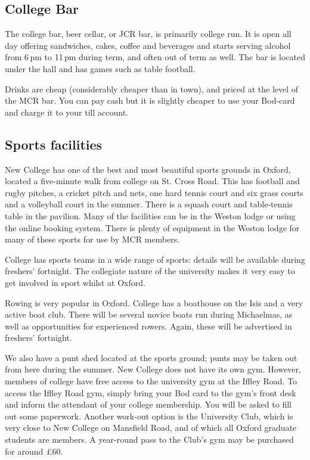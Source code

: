 \subsection{College Bar}
The college bar, beer cellar, or JCR bar, is primarily college run. It is open
all day offering sandwiches, cakes, coffee and beverages and starts serving
alcohol from 6\,pm to 11\,pm during term, and often out of term as well. The bar
is located under the hall and has games such as table football.

Drinks are cheap (considerably cheaper than in town), and priced at the
level of the MCR bar. You can pay cash but it is slightly cheaper to use your Bod-card and charge it to your till account.

\subsection{Sports facilities}
New College has one of the best and most beautiful sports grounds in Oxford, located a five-minute walk from college on St. Cross Road. This has football and rugby pitches, a cricket pitch and nets, one hard tennis court and six grass courts and a volleyball court in the summer. There is a squash court and table-tennis table in the pavilion. Many of the facilities can be in the Weston lodge or using the online booking system. There is plenty of equipment in the Weston lodge for many of these sports for use by MCR members. 

College has sports teams in a wide range of sports: details will be available during freshers' fortnight. The collegiate nature of the university makes it very easy to get involved in sport whilst at Oxford.

Rowing is very popular in Oxford. College has a boathouse on the Isis and a very active boat club. There will be several novice boats run during Michaelmas, as well as opportunities for experienced rowers. Again, these will be advertised in freshers' fortnight.

We also have a punt shed located at the sports ground; punts may be taken out
from here during the summer. New College does not have its own gym. However,
members of college have free access to the university gym at the Iffley Road. To
access the Iffley Road gym, simply bring your Bod card to the gym's front desk
and inform the attendant of your college membership. You will be asked to fill
out some paperwork. Another work-out option is the University Club, which is
very close to New College on Mansfield Road, and of which all Oxford graduate
students are members. A year-round pass to the Club's gym may be purchased for
around \pounds60.

